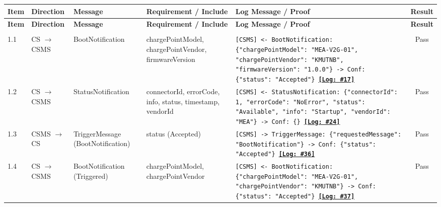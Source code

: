 \documentclass[10pt, a4paper, landscape]{article}
\begin{document}
\renewcommand{\arraystretch}{1.3}
\begin{longtable}{|p{1.0cm}|p{2.5cm}|p{4.0cm}|p{5.0cm}|p{10.0cm}|c|}
\hline
\rowcolor{gray!30}
\textbf{Item} & \textbf{Direction} & \textbf{Message} & \textbf{Requirement / Include} & \textbf{Log Message / Proof} & \textbf{Result} \\
\hline
\endfirsthead

\hline
\rowcolor{gray!30}
\textbf{Item} & \textbf{Direction} & \textbf{Message} & \textbf{Requirement / Include} & \textbf{Log Message / Proof} & \textbf{Result} \\
\hline
\endhead

\hline
\endfoot

\multicolumn{6}{|l|}{\cellcolor{blue!10}\textbf{1. Configuration Verification}} \\
\hline
1.1 & CS $\to$ CSMS & BootNotification & chargePointModel, chargePointVendor, firmwareVersion & \footnotesize\texttt{[CSMS] <- BootNotification: \{"chargePointModel": "MEA-V2G-01", "chargePointVendor": "KMUTNB", "firmwareVersion": "1.0.0"\} \newline [CSMS] -> Conf: \{"status": "Accepted"\} \newline \hyperref[log:1.1]{\textbf{[Log: \#17]}}} & Pass \\
\hline
1.2 & CS $\to$ CSMS & StatusNotification & connectorId, errorCode, info, status, timestamp, vendorId & \footnotesize\texttt{[CSMS] <- StatusNotification: \{"connectorId": 1, "errorCode": "NoError", "status": "Available", "info": "Startup", "vendorId": "MEA"\} \newline [CSMS] -> Conf: \{\} \newline \hyperref[log:1.2]{\textbf{[Log: \#24]}}} & Pass \\
\hline
1.3 & CSMS $\to$ CS & TriggerMessage (BootNotification) & status (Accepted) & \footnotesize\texttt{[CSMS] -> TriggerMessage: \{"requestedMessage": "BootNotification"\} \newline [CS] -> Conf: \{"status": "Accepted"\} \newline \hyperref[log:1.3]{\textbf{[Log: \#36]}}} & Pass \\
\hline
1.4 & CS $\to$ CSMS & BootNotification (Triggered) & chargePointModel, chargePointVendor & \footnotesize\texttt{[CSMS] <- BootNotification: \{"chargePointModel": "MEA-V2G-01", "chargePointVendor": "KMUTNB"\} \newline [CSMS] -> Conf: \{"status": "Accepted"\} \newline \hyperref[log:1.4]{\textbf{[Log: \#37]}}} & Pass \\

\end{longtable}
\end{document}
